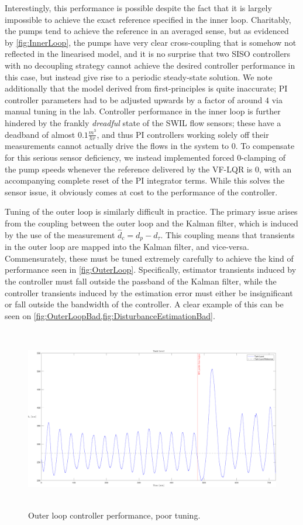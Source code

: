 Interestingly, this performance is possible despite the fact that it is largely impossible to achieve the exact reference specified in the inner loop. Charitably, the pumps tend to achieve the reference in an averaged sense, but as evidenced by \cref{fig:InnerLoop}, the pumps have very clear cross-coupling that is somehow not reflected in the linearised model, and it is no surprise that two SISO controllers with no decoupling strategy cannot achieve the desired controller performance in this case, but instead give rise to a periodic steady-state solution. We note additionally that the model derived from first-principles is quite inaccurate; PI controller parameters had to be adjusted upwards by a factor of around $4$ via manual tuning in the lab. Controller performance in the inner loop is further hindered by the frankly \textit{dreadful} state of the SWIL flow sensors; these have a deadband of almost $0.1 \si{\frac{m^3}{hr}}$, and thus PI controllers working solely off their measurements cannot actually drive the flows in the system to $0$. To compensate for this serious sensor deficiency, we instead implemented forced $0$-clamping of the pump speeds whenever the reference delivered by the VF-LQR is $0$, with an accompanying complete reset of the PI integrator terms. While this solves the sensor issue, it obviously comes at cost to the performance of the controller.

Tuning of the outer loop is similarly difficult in practice. The primary issue arises from the coupling between the outer loop and the Kalman filter, which is induced by the use of the measurement $\hat{d}_c = d_p - d_\tau$. This coupling means that transients in the outer loop are mapped into the Kalman filter, and vice-versa. Commensurately, these must be tuned extremely carefully to achieve the kind of performance seen in \cref{fig:OuterLoop}. Specifically, estimator transients induced by the controller must fall outside the passband of the Kalman filter, while the controller transients induced by the estimation error must either be insignificant or fall outside the bandwidth of the controller. A clear example of this can be seen on \cref{fig:OuterLoopBad,fig:DisturbanceEstimationBad}.

\clearpage

\begin{figure}[h!]
	\includegraphics[height=8cm,width=\linewidth]{Pictures/OuterLoopBad.pdf}
	\caption{Outer loop controller performance, poor tuning.}
	\label{fig:OuterLoopBad}
\end{figure}

